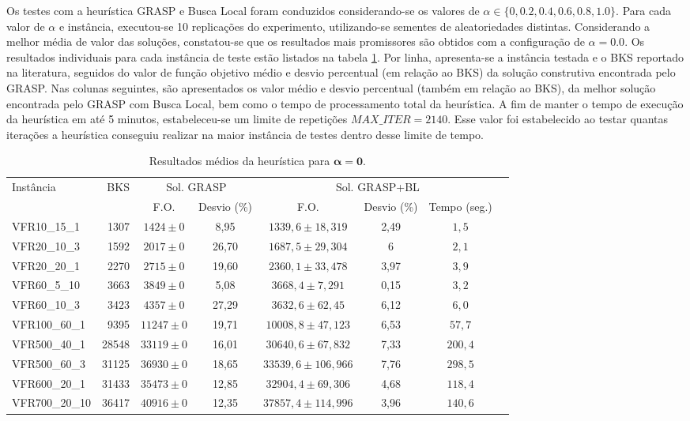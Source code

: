 \documentclass[12pt]{article}
\begin{document}
Os testes com a heurística GRASP e Busca Local foram conduzidos 
considerando-se os
valores de $\alpha \in \{0, 0.2, 0.4, 0.6, 0.8, 1.0\}$. Para cada valor de
$\alpha$ e instância, executou-se 10 replicações do experimento, 
utilizando-se sementes de aleatoriedades distintas. Considerando a melhor média
de valor das soluções, constatou-se que os resultados mais promissores são
obtidos com a configuração de $\alpha = 0.0$. Os resultados individuais para
cada instância de teste estão listados na tabela
\ref{table:results-heur-short}. Por linha, apresenta-se a instância testada e o
BKS reportado na literatura, seguidos do valor de função objetivo médio 
e desvio percentual (em relação ao BKS)
da solução construtiva encontrada pelo GRASP. Nas colunas seguintes, 
são apresentados os valor médio e desvio percentual (também em relação 
ao BKS), da melhor
solução encontrada pelo GRASP com Busca Local, bem como o tempo de
processamento total da heurística. A fim de manter o tempo
de execução da heurística em até 5 minutos, estabeleceu-se um limite de
repetições $\mathit{MAX\_ITER} = 2140$. Esse valor foi estabelecido ao testar
quantas iterações a heurística conseguiu realizar na maior instância de testes
dentro desse limite de tempo.

\begin{table}[ht]
   \centering
   \scriptsize
   \begin{tabular}{lrcccccc}
   \toprule
   \multirow{2}[2]{*}{Instância} & \multirow{2}[2]{*}{BKS} & \multicolumn{2}{c}{Sol. GRASP} & 
      \multicolumn{3}{c}{Sol. GRASP+BL}\\ \cmidrule(r){3-4} \cmidrule{5-7}
   & & F.O. & Desvio (\%) & F.O. & Desvio (\%) & Tempo (seg.)\\
   \midrule
   VFR10\_15\_1 & 1307 & $1424 \pm 0$ & 8,95 & $1339,6 \pm 18,319$ & 2,49 & $1,5$ \\ 
   VFR20\_10\_3 & 1592 & $2017 \pm 0$ & 26,70 & $1687,5 \pm 29,304$ & 6 & $2,1$ \\ 
   VFR20\_20\_1 & 2270 & $2715 \pm 0$ & 19,60 & $2360,1 \pm 33,478$ & 3,97 & $3,9$ \\ 
   VFR60\_5\_10 & 3663 & $3849 \pm 0$ & 5,08 & $3668,4 \pm 7,291$ & 0,15 & $3,2$ \\ 
   VFR60\_10\_3 & 3423 & $4357 \pm 0$ & 27,29 & $3632,6 \pm 62,45$ & 6,12 &
   $6,0$ \\ 
   VFR100\_60\_1 & 9395  & $11247 \pm 0$ & 19,71 & $10008,8 \pm 47,123$ & 6,53 & $57,7$ \\ 
   VFR500\_40\_1 & 28548 & $33119 \pm 0$ & 16,01 & $30640,6 \pm 67,832$ & 7,33 & $200,4$ \\ 
   VFR500\_60\_3 & 31125 & $36930 \pm 0$ & 18,65 & $33539,6 \pm 106,966$ & 7,76 & $298,5$ \\ 
   VFR600\_20\_1 & 31433 & $35473 \pm 0$ & 12,85 & $32904,4 \pm 69,306$ & 4,68 & $118,4$ \\ 
   VFR700\_20\_10 & 36417 & $40916 \pm 0$ & 12,35 & $37857,4 \pm 114,996$ & 3,96 & $140,6$ \\ 
   \bottomrule
   \end{tabular}
   \caption{Resultados médios da heurística para $\bm{\alpha = 0}$.} 
   \label{table:results-heur-short}
\end{table}
\end{document}
